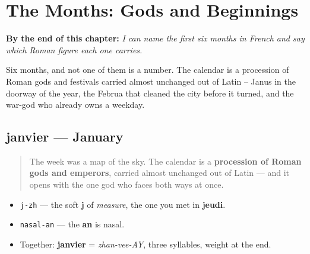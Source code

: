 
\chapter{The Months: Gods and Beginnings}
\label{ch:months-gods}

\begin{chapteropening}
\textbf{By the end of this chapter:} \emph{I can name the first six months in French and say which Roman figure each one carries.}

Six months, and not one of them is a number. The calendar is a procession of Roman gods and festivals carried almost unchanged out of Latin -- Janus in the doorway of the year, the Februa that cleaned the city before it turned, and the war-god who already owns a weekday.
\end{chapteropening}

\section[janvier]{janvier — January}

\label{lesson:FR-C09-janvier}



\begin{quote}
The week was a map of the sky. The calendar is a \textbf{procession of Roman gods and emperors}, carried almost unchanged out of Latin — and it opens with the one god who faces both ways at once.
\end{quote}

\begin{sounds}
\begin{itemize}
\raggedright
  \item \texttt{j-zh} — the soft \textbf{j} of \emph{measure}, the one you met in \textbf{jeudi}.
  \item \texttt{nasal-an} — the \textbf{an} is nasal.
  \item Together: \textbf{janvier} = \emph{zhan-vee-AY}, three syllables, weight at the end.
\end{itemize}
\end{sounds}


